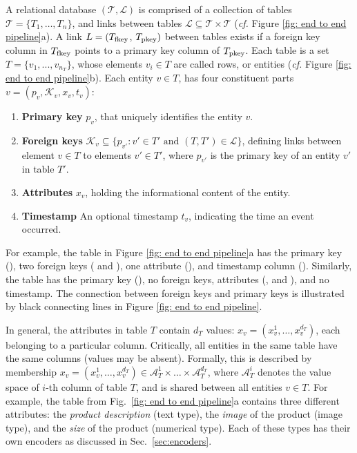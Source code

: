  A relational database $(\mathcal T, \mathcal L)$ is comprised of a collection of tables $\mathcal T = \{T_1 , \ldots , T_n\}$, and links between tables $\mathcal L \subseteq \mathcal T \times \mathcal T$ (\emph{cf.} Figure \ref{fig: end to end pipeline}a). A link $L = (T_{\rm fkey}$, $T_{\rm pkey})$ between tables exists if a foreign key column in $T_{\rm fkey}$ points to a primary key column of $T_{\rm pkey}$.
Each table is a set $T = \{v_1, ..., v_{n_T}\}$, whose elements $v_i \in T$ are called rows, or entities (\emph{cf.} Figure \ref{fig: end to end pipeline}b). Each entity $v \in T$, has four constituent parts $v = (p_v, \mathcal K_v, x_v, t_v)$: 
\begin{enumerate}
    \item \textbf{Primary key} $p_v$, that uniquely identifies the entity $v$. 
    \item \textbf{Foreign keys} $\mathcal K_v\subseteq \{p_{v'}:  v' \in T'\text{ and } (T, T') \in \mathcal L \}$, defining links between element $v\in T$ to elements $v' \in T'$, where $p_{v'}$ is the primary key of an entity $v'$ in table $T'$. 
    \item \textbf{Attributes} $x_v$, holding the informational content of the entity. %
    \item \textbf{Timestamp} An optional timestamp $t_v$, indicating the time an event occurred. 
\end{enumerate}

For example, the  table in Figure \ref{fig: end to end pipeline}a has the primary key (), two foreign keys ( and ), one attribute (), and timestamp column (). Similarly, the  table has the primary key (), no foreign keys, attributes (,  and ), and no timestamp. The connection between foreign keys and primary keys is illustrated by black connecting lines in Figure \ref{fig: end to end pipeline}.

In general, the attributes in table $T$ contain $d_T$ values: $x_v= (x_v^1, \ldots , x_v^{d_T})$, each belonging to a particular column. Critically, all entities in the same table have the same columns (values may be absent). Formally, this is described by membership  $x_v= (x_v^1, \ldots , x_v^{d_T}) \in \mathcal A_T^1 \times \ldots \times \mathcal A_T^{d_T}$, where $\mathcal A^i_T$ denotes the value space of $i$-th column of table $T$, and is shared between all entities $v \in T$.
For example, the  table from Fig.~\ref{fig: end to end pipeline}a contains three different attributes: the \emph{product description} (text type), the \emph{image} of the product (image type), and the \emph{size} of the product (numerical type). Each of these types has their own encoders as discussed in Sec.~\ref{sec:encoders}. 


